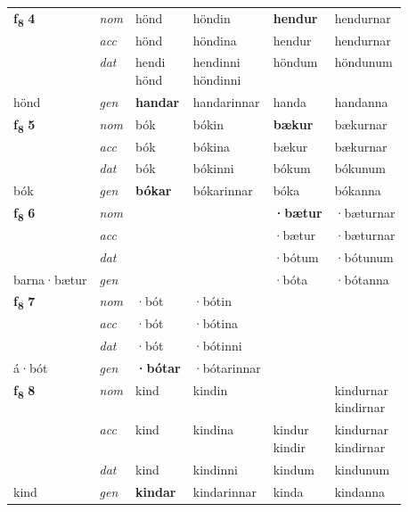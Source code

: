\begin{longtable}[l]{X>{\footnotesize\itshape}XXXXX}
\multirow{3}{*}{{{\textbf{f{\textsubscript{8}}} \Large{\textbf{4}}}}} & nom & hönd & höndin & \textbf{hendur} & hendurnar \\*
 & acc & hönd & höndina & hendur & hendurnar \\*
 & dat & \specialcell{hendi\\ hönd} & \specialcell{hendinni\\ höndinni} & höndum & höndunum \\*
 {\footnotesize{hönd}} & gen & \textbf{handar} & handarinnar & handa & handanna \\
\midrule

\multirow{3}{*}{{{\textbf{f{\textsubscript{8}}} \Large{\textbf{5}}}}} & nom & bók & bókin & \textbf{bækur} & bækurnar \\*
 & acc & bók & bókina & bækur & bækurnar \\*
 & dat & bók & bókinni & bókum & bókunum \\*
 {\footnotesize{bók}} & gen & \textbf{bókar} & bókarinnar & bóka & bókanna \\
\midrule

\multirow{3}{*}{{{\textbf{f{\textsubscript{8}}} \Large{\textbf{6}}}}} & nom &  &  & \textbf{·bætur} & ·bæturnar \\*
 & acc &  &  & ·bætur & ·bæturnar \\*
 & dat &  &  & ·bótum & ·bótunum \\*
 {\footnotesize{barna\allowbreak ·bætur}} & gen & \textbf{} &  & ·bóta & ·bótanna \\
\midrule

\multirow{3}{*}{{{\textbf{f{\textsubscript{8}}} \Large{\textbf{7}}}}} & nom & ·bót & ·bótin & \textbf{} &  \\*
 & acc & ·bót & ·bótina &  &  \\*
 & dat & ·bót & ·bótinni &  &  \\*
 {\footnotesize{á\allowbreak ·bót}} & gen & \textbf{·bótar} & ·bótarinnar &  &  \\
\midrule

\multirow{3}{*}{{{\textbf{f{\textsubscript{8}}} \Large{\textbf{8}}}}} & nom & kind & kindin & \textbf{\specialcell{kindur\\ kindir}} & \specialcell{kindurnar\\ kindirnar} \\*
 & acc & kind & kindina & \specialcell{kindur\\ kindir} & \specialcell{kindurnar\\ kindirnar} \\*
 & dat & kind & kindinni & kindum & kindunum \\*
 {\footnotesize{kind}} & gen & \textbf{kindar} & kindarinnar & kinda & kindanna \\
\midrule


\end{longtable}
